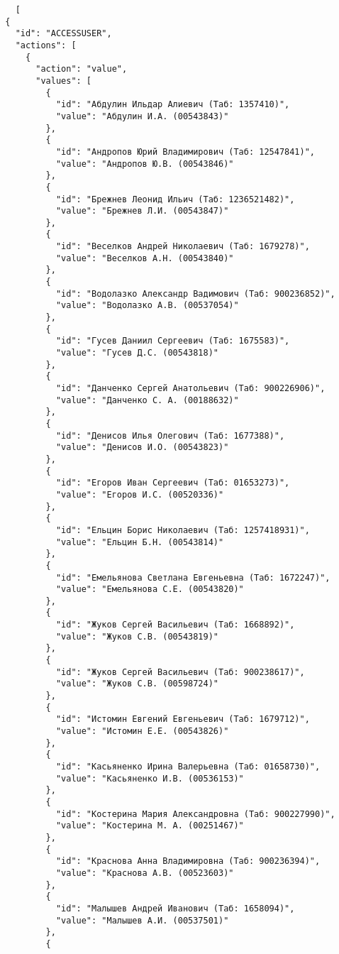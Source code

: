 \documentclass[../index.tex]{subfiles}
\begin{document}
\begin{verbatim}
    [
  {
    "id": "ACCESSUSER",
    "actions": [
      {
        "action": "value",
        "values": [
          {
            "id": "Абдулин Ильдар Алиевич (Таб: 1357410)",
            "value": "Абдулин И.А. (00543843)"
          },
          {
            "id": "Андропов Юрий Владимирович (Таб: 12547841)",
            "value": "Андропов Ю.В. (00543846)"
          },
          {
            "id": "Брежнев Леонид Ильич (Таб: 1236521482)",
            "value": "Брежнев Л.И. (00543847)"
          },
          {
            "id": "Веселков Андрей Николаевич (Таб: 1679278)",
            "value": "Веселков А.Н. (00543840)"
          },
          {
            "id": "Водолазко Александр Вадимович (Таб: 900236852)",
            "value": "Водолазко А.В. (00537054)"
          },
          {
            "id": "Гусев Даниил Сергеевич (Таб: 1675583)",
            "value": "Гусев Д.С. (00543818)"
          },
          {
            "id": "Данченко Сергей Анатольевич (Таб: 900226906)",
            "value": "Данченко С. А. (00188632)"
          },
          {
            "id": "Денисов Илья Олегович (Таб: 1677388)",
            "value": "Денисов И.О. (00543823)"
          },
          {
            "id": "Егоров Иван Сергеевич (Таб: 01653273)",
            "value": "Егоров И.С. (00520336)"
          },
          {
            "id": "Ельцин Борис Николаевич (Таб: 1257418931)",
            "value": "Ельцин Б.Н. (00543814)"
          },
          {
            "id": "Емельянова Светлана Евгеньевна (Таб: 1672247)",
            "value": "Емельянова С.Е. (00543820)"
          },
          {
            "id": "Жуков Сергей Васильевич (Таб: 1668892)",
            "value": "Жуков С.В. (00543819)"
          },
          {
            "id": "Жуков Сергей Васильевич (Таб: 900238617)",
            "value": "Жуков С.В. (00598724)"
          },
          {
            "id": "Истомин Евгений Евгеньевич (Таб: 1679712)",
            "value": "Истомин Е.Е. (00543826)"
          },
          {
            "id": "Касьяненко Ирина Валерьевна (Таб: 01658730)",
            "value": "Касьяненко И.В. (00536153)"
          },
          {
            "id": "Костерина Мария Александровна (Таб: 900227990)",
            "value": "Костерина М. А. (00251467)"
          },
          {
            "id": "Краснова Анна Владимировна (Таб: 900236394)",
            "value": "Краснова А.В. (00523603)"
          },
          {
            "id": "Малышев Андрей Иванович (Таб: 1658094)",
            "value": "Малышев А.И. (00537501)"
          },
          {

\end{verbatim}
\end{document}
